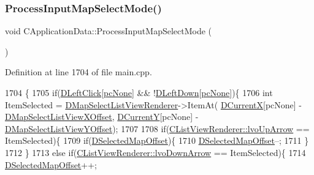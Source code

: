 \subsubsection{\texorpdfstring{Process\+Input\+Map\+Select\+Mode()}{ProcessInputMapSelectMode()}}
{\footnotesize\ttfamily void C\+Application\+Data\+::\+Process\+Input\+Map\+Select\+Mode (\begin{DoxyParamCaption}{ }\end{DoxyParamCaption})\hspace{0.3cm}{\ttfamily [protected]}}



Definition at line 1704 of file main.\+cpp.


\begin{DoxyCode}
1704                                                 \{
1705     \textcolor{keywordflow}{if}(\hyperlink{classCApplicationData_a8a86bb4c7cba7b119121401dda4ca68b}{DLeftClick}[\hyperlink{GameDataTypes_8h_aafb0ca75933357ff28a6d7efbdd7602fa88767aa8e02c7b3192bbab4127b3d729}{pcNone}] && !\hyperlink{classCApplicationData_a2b943f18557c3e4c8cd4550e22e028b6}{DLeftDown}[\hyperlink{GameDataTypes_8h_aafb0ca75933357ff28a6d7efbdd7602fa88767aa8e02c7b3192bbab4127b3d729}{pcNone}])\{
1706         \textcolor{keywordtype}{int} ItemSelected = \hyperlink{classCApplicationData_a5e5746ba44c03038d1a392872614de14}{DMapSelectListViewRenderer}->ItemAt(
      \hyperlink{classCApplicationData_a1dc7ee482a39f7978c71365ac540f97a}{DCurrentX}[pcNone] - \hyperlink{classCApplicationData_aa5a89b442e384acdf1c2aefc7ce4233b}{DMapSelectListViewXOffset}, 
      \hyperlink{classCApplicationData_a0ba39779ae11c8072258c6ddfebd6052}{DCurrentY}[pcNone] - \hyperlink{classCApplicationData_ae1a8eb3fff3cf5bc236564925bec1c8c}{DMapSelectListViewYOffset});
1707         
1708         \textcolor{keywordflow}{if}(\hyperlink{classCListViewRenderer_a120f3c9b0b96dd6e9bce814a52aafb93a097e5e7377e3436187159f67e1aafbe1}{CListViewRenderer::lvoUpArrow} == ItemSelected)\{
1709             \textcolor{keywordflow}{if}(\hyperlink{classCApplicationData_a443edd0c2c7964fc51a82bf2a016725b}{DSelectedMapOffset})\{
1710                 \hyperlink{classCApplicationData_a443edd0c2c7964fc51a82bf2a016725b}{DSelectedMapOffset}--;    
1711             \}
1712         \}
1713         \textcolor{keywordflow}{else} \textcolor{keywordflow}{if}(\hyperlink{classCListViewRenderer_a120f3c9b0b96dd6e9bce814a52aafb93af916162772cb53552d541174c8354036}{CListViewRenderer::lvoDownArrow} == ItemSelected)\{
1714             \hyperlink{classCApplicationData_a443edd0c2c7964fc51a82bf2a016725b}{DSelectedMapOffset}++;

\end{DoxyCode}
